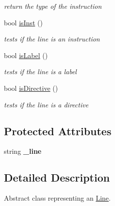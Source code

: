 \begin{DoxyCompactItemize}
\begin{DoxyCompactList}\small\item\em return the type of the instruction \end{DoxyCompactList}\item 
\hypertarget{classLine_a57e724949fa0828dfdd2a1bb0f7db8d0}{bool \hyperlink{classLine_a57e724949fa0828dfdd2a1bb0f7db8d0}{is\-Inst} ()}\label{classLine_a57e724949fa0828dfdd2a1bb0f7db8d0}

\begin{DoxyCompactList}\small\item\em tests if the line is an instruction \end{DoxyCompactList}\item 
\hypertarget{classLine_a8323f3df960924826199bd607198ac7f}{bool \hyperlink{classLine_a8323f3df960924826199bd607198ac7f}{is\-Label} ()}\label{classLine_a8323f3df960924826199bd607198ac7f}

\begin{DoxyCompactList}\small\item\em tests if the line is a label \end{DoxyCompactList}\item 
\hypertarget{classLine_ad014e40a75c8a04e6a091ae4110579bc}{bool \hyperlink{classLine_ad014e40a75c8a04e6a091ae4110579bc}{is\-Directive} ()}\label{classLine_ad014e40a75c8a04e6a091ae4110579bc}

\begin{DoxyCompactList}\small\item\em tests if the line is a directive \end{DoxyCompactList}\end{DoxyCompactItemize}
\subsection*{\-Protected \-Attributes}
\begin{DoxyCompactItemize}
\item 
\hypertarget{classLine_a41059923f5c8e5a0f4f44d84bd8762aa}{string {\bfseries \-\_\-line}}\label{classLine_a41059923f5c8e5a0f4f44d84bd8762aa}

\end{DoxyCompactItemize}


\subsection{\-Detailed \-Description}
\-Abstract class representing an \hyperlink{classLine}{\-Line}. 

